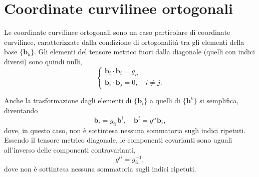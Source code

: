 \section{Coordinate curvilinee ortogonali}\label{ch:tensori:coordinate_ortogonali}


 Le coordinate curvilinee ortogonali sono un caso particolare di coordinate curvilinee, caratterizzate dalla condizione di ortogonalità tra gli elementi della base $\{ \bm{b}_k \}$. Gli elementi del tensore metrico fuori dalla diagonale (quelli con indici diversi) sono
 quindi nulli,
 \begin{equation}
 \begin{cases}
   \bm{b}_i \cdot \bm{b}_i = g_{ii} \\
   \bm{b}_i \cdot \bm{b}_j = 0     , \quad  i \neq j .
 \end{cases}
 \end{equation}
 
 \noindent
 Anche la trasformazione dagli elementi di $\{ \bm{b}_i \}$ a quelli di $\{ \bm{b}^k \}$ si semplifica, diventando
 \begin{equation}
  \bm{b}_i = g_{ii} \bm{b}^i  , \quad \bm{b}^i = g^{ii} \bm{b}_i ,
 \end{equation}
 dove, in questo caso, non è sottintesa nessuna sommatoria sugli indici ripetuti.
 Essendo il tensore metrico diagonale, le componenti covarianti sono uguali all'inverso delle componenti contravarianti,
 \begin{equation}
  g^{ii} = g_{ii}^{-1} ,
 \end{equation}
 dove non è sottintesa nessuna sommatoria sugli indici ripetuti.
%
